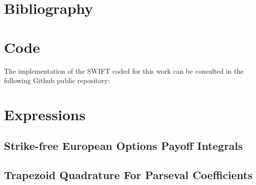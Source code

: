 \documentclass[12,twoside]{mammeTFM}
\theoremstyle{definition}
\theoremstyle{remark}
\begin{document}
\section{Bibliography}


{}


\appendix
\vfill\newpage 
\section{Code}
The implementation of the SWIFT coded for this work can be consulted in the following Github public repository:


\section{Expressions}

\subsection{Strike-free European Options Payoff Integrals} \label{app:payoff_integral}

\subsection{Trapezoid Quadrature For Parseval Coefficients}
\end{document}
